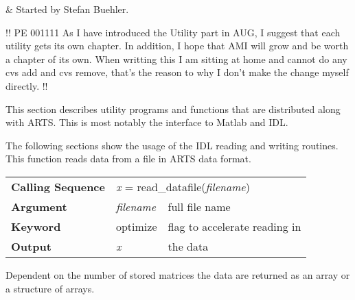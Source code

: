 %
%
 \label{sec:utilities}

%
%
 & Started by Stefan Buehler.\\
\stophistory


!! PE 001111 As I have introduced the Utility part in AUG, I suggest that each
utility gets its own chapter. In addition, I hope that AMI will grow and be worth a chapter of its own. When writting this I am sitting at home and cannot do
any cvs add and cvs remove, that's the reason to why I don't make the change myself directly. !!

This section describes utility programs and functions that are
distributed along with ARTS. This is most notably the interface to
Matlab and IDL.


\label{sec:utilities:aii}

The following sections show the usage of the IDL reading and writing
routines.
This function reads data from a file in ARTS data format.
\begin{center}
\begin{tabular}{|l|ll|}
  \hline
  \textbf{Calling Sequence} &
  \multicolumn{2}{l|}{\textit{x} = %
  {\ttfamily read\_datafile(\textnormal{\textit{filename}})}}     \\ 
  \textbf{Argument} & \textit{filename} & full file name          \\
  \textbf{Keyword}  & optimize          & flag to accelerate reading
                                          in                      \\
  \textbf{Output}   & \textit{x}        & the data                \\
  \hline
\end{tabular}
\end{center}
Dependent on the number of stored matrices the data are returned as an
array or a structure of arrays.

